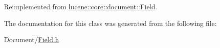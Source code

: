 Reimplemented from \mbox{\hyperlink{classlucene_1_1core_1_1document_1_1Field_a949822599f392fb7fca20423902e535a}{lucene\+::core\+::document\+::\+Field}}.



The documentation for this class was generated from the following file\+:\begin{DoxyCompactItemize}
\item 
Document/\mbox{\hyperlink{Document_2Field_8h}{Field.\+h}}\end{DoxyCompactItemize}
